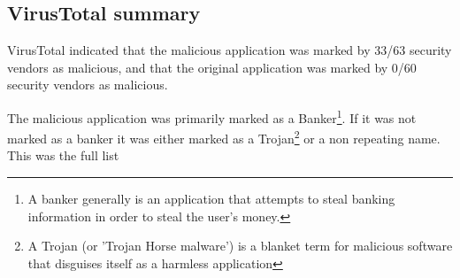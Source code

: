 \subsection{VirusTotal summary}

VirusTotal indicated that the malicious application was marked by 33/63 security vendors as malicious, 
and that the original application was marked by 0/60 security vendors as malicious.

The malicious application was primarily marked as a Banker\footnote{A banker generally is an application that attempts to steal banking information in order to steal the user's money.}. 
If it was not marked as a banker it was either marked as a Trojan\footnote{A Trojan (or 'Trojan Horse malware') is a blanket term for malicious software that disguises itself as a harmless application} or a non repeating name.
This was the full list



